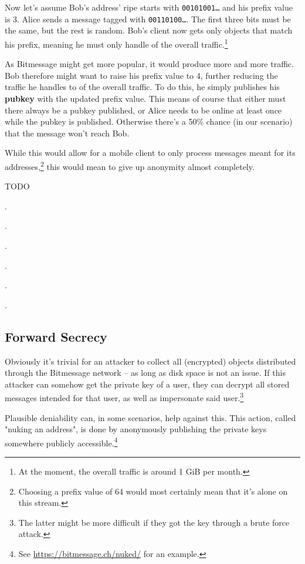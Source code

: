 \documentclass{bfh}
\newcommand{\obj}[1]{\textbf{\textcolor{OliveGreen}{#1}}}
\begin{document}
  Now let's assume Bob's address' ripe starts with \texttt{00101001\ldots} and his prefix value is 3. Alice sends a message tagged with \texttt{00110100\ldots}. The first three bits must be the same, but the rest is random. Bob's client now gets only objects that match his prefix, meaning he must only handle  of the overall traffic.\footnote{At the moment, the overall traffic is around 1 GiB per month.}

  As Bitmessage might get more popular, it would produce more and more traffic. Bob therefore might want to raise his prefix value to 4, further reducing the traffic he handles to  of the overall traffic. To do this, he simply publishes his \obj{pubkey} with the updated prefix value. This means of course that either must there always be a pubkey published, or Alice needs to be online at least once while the pubkey is published. Otherwise there's a 50\% chance (in our scenario) that the message won't reach Bob.

  While this would allow for a mobile client to only process messages meant for its addresses,\footnote{Choosing a prefix value of 64 would most certainly mean that it's alone on this stream.} this would mean to give up anonymity almost completely.

  TODO

  .

  .

  .

  .

  .

  .

  \subsection{Forward Secrecy}

  Obviously it's trivial for an attacker to collect all (encrypted) objects distributed through the Bitmessage network -- as long as disk space is not an issue. If this attacker can somehow get the private key of a user, they can decrypt all stored messages intended for that user, as well as impersonate said user.\footnote{The latter might be more difficult if they got the key through a brute force attack.}

  Plausible deniability can, in some scenarios, help against this. This action, called "nuking an address", is done by anonymously publishing the private keys somewhere publicly accessible.\footnote{See \url{https://bitmessage.ch/nuked/} for an example.}
\end{document}
